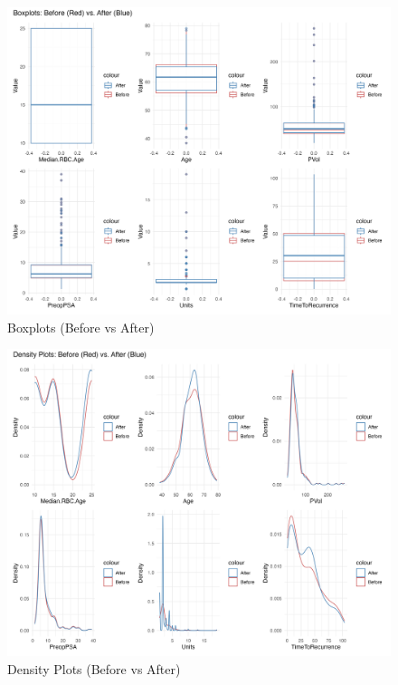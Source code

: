 \documentclass[
]{article}
\begin{document}
\begin{figure}[H]

{\centering \includegraphics[width=0.9\linewidth]{../example/boxplots_before_after} 

}

\caption{Boxplots (Before vs After)}\label{fig:show-boxplot}
\end{figure}

\begin{figure}[H]

{\centering \includegraphics[width=0.9\linewidth]{../example/density_plots_before_after} 

}

\caption{Density Plots (Before vs After)}\label{fig:show-densityplot}
\end{figure}
\end{document}
